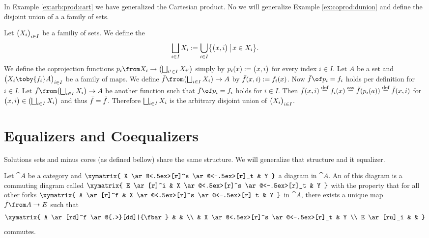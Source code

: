In Example \ref{ex:arb:prod:cart} we have generalized the Cartesian product.
No we will generalize Example \ref{ex:coprod:dunion} and define the disjoint union of a a family of sets.

\begin{example}
  \label{ex:arb:coprod:dunion}
  Let $\bigl( X_i \bigr)_{i \in I}$ be a familiy of sets. We define the 
  $$\bigsqcup_{i \in I}{X_i} := \bigcup_{i \in I} \bigl \{ \bigl( x , i \bigr) \,\big|\, x \in X_i \bigr \}.$$
  We define the coprojection functions $p_i \from X_i \to \bigl(\bigdunion_{i' \in I}{X_{i'}}\bigr)$ simply by $p_i(x) := \bigl( x , i \bigr)$ for every index $i \in I$.
  Let $A$ be a set and $\family{X_i \toby{f_i} A}{i \in I}$ be a family of maps. We define $\fbar \from \bigl(\bigdunion_{i \in I}{X_i}\bigr) \to A$ by $\bar{f}(x, i) := f_i(x)$.
  Now $\fbar \of p_i = f_i$ holds per definition for $i \in I$.
  Let $\ftilde \from \bigl(\bigdunion_{i \in I}{X_i}\bigr) \to A$ be another function such that $\ftilde \of p_i = f_i$ holds for $i \in I$. Then
  $\bar{f}(x, i) \stackrel{\text{def}}{=} f_i(x) \stackrel{\text{ass}}{=} \tilde{f}(p_i(a)) \stackrel{\text{def}}{=} \tilde{f}(x, i)$ for $\bigl( x , i \bigr) \in \bigl(\bigsqcup_{i \in I}{X_i}\bigr)$ and thus $\bar{f} = \tilde{f}$.
  Therefore $\bigsqcup_{i \in I}{X_i}$ is the arbitrary disjoint union of $\bigl( X_i \bigr)_{i \in I}$.
\end{example}

\section*{Equalizers and Coequalizers}

Solutions sets and minus cores (as defined bellow) share the same structure.
We will generalize that structure and it equalizer.

\begin{definition}[Equalizer]
  \label{def:equa}
  Let $\cat{A}$ be a category and
  $ \xymatrix{
    X \ar@<.5ex>[r]^s \ar@<-.5ex>[r]_t & Y
  } $
  a diagram in $\cat{A}$.
  An  of this diagram is a commuting diagram called 
  $ \xymatrix{
    E \ar[r]^i & X \ar@<.5ex>[r]^s \ar@<-.5ex>[r]_t & Y
  } $
  with the property that for all other forks
  $ \xymatrix{
    A \ar[r]^f & X \ar@<.5ex>[r]^s \ar@<-.5ex>[r]_t & Y
  } $
  in $\cat{A}$, there exists a unique map $\fbar\from A \to E$ such that
  \[ \xymatrix{
    A \ar[rd]^f \ar@{.>}[dd]|{\fbar} & & \\
    & X \ar@<.5ex>[r]^s \ar@<-.5ex>[r]_t & Y \\
    E \ar[ru]_i & &
  } \]
  commutes.
\end{definition}

